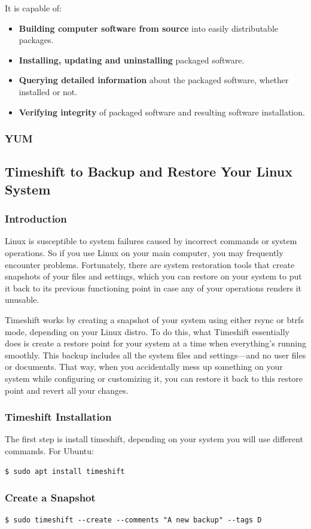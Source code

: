 \documentclass{article}
\newenvironment{codetemplate}[1][]{%
  \mybasecolorbox[#1]
  \itshape
}{%
  \endmybasecolorbox
}
\begin{document}
It is capable of:

\begin{itemize}
    \item \textbf{Building computer software from source} into easily distributable packages.
    \item \textbf{Installing, updating and uninstalling} packaged software.
    \item \textbf{Querying detailed information} about the packaged software, whether installed or not.
    \item \textbf{Verifying integrity} of packaged software and resulting software installation.
\end{itemize}

\subsubsection{YUM}

\subsection{Timeshift to Backup and Restore Your Linux System}

\subsubsection{Introduction}
Linux is susceptible to system failures caused by incorrect commands or system operations. So if you use Linux on your main computer, you may frequently encounter problems. Fortunately, there are system restoration tools that create snapshots of your files and settings, which you can restore on your system to put it back to its previous functioning point in case any of your operations renders it unusable.

Timeshift works by creating a snapshot of your system using either rsync or btrfs mode, depending on your Linux distro. To do this, what Timeshift essentially does is create a restore point for your system at a time when everything's running smoothly. This backup includes all the system files and settings—and no user files or documents. That way, when you accidentally mess up something on your system while configuring or customizing it, you can restore it back to this restore point and revert all your changes.

\subsubsection{Timeshift Installation}
The first step is install timeshift, depending on your system you will use different commands. For Ubuntu:
\begin{codetemplate}{}
\begin{verbatim}
$ sudo apt install timeshift
\end{verbatim}
\end{codetemplate}

\subsubsection{Create a Snapshot}
\begin{codetemplate}{}
\begin{verbatim}
$ sudo timeshift --create --comments "A new backup" --tags D
\end{verbatim}
\end{codetemplate}
\end{document}
